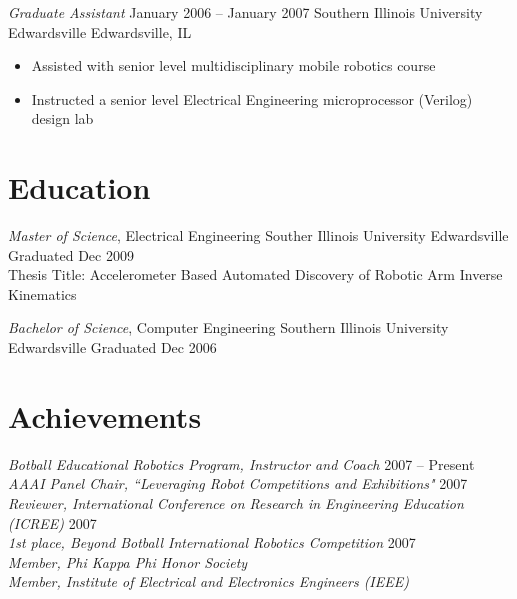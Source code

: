 \documentclass[margin,line]{resume}
\begin{document}
\begin{resume}
{\sl Graduate Assistant} \hfill January 2006 -- January 2007
Southern Illinois University Edwardsville \hfill Edwardsville, IL
\begin{itemize} \itemsep -2pt %
    \small\item Assisted with senior level multidisciplinary mobile robotics course
    \small\item Instructed a senior level Electrical Engineering microprocessor (Verilog) design lab
\end{itemize}

\section{Education}

{\small
  {\sl Master of Science}, Electrical Engineering \hfill
  Souther Illinois University Edwardsville \hfill
  Graduated Dec 2009\\
  Thesis Title: Accelerometer Based Automated Discovery of Robotic Arm Inverse Kinematics
}

{\small
  {\sl Bachelor of Science}, Computer Engineering \hfill
  Southern Illinois University Edwardsville \hfill
  Graduated Dec 2006
}

\section{Achievements}

{\sl Botball Educational Robotics Program, Instructor and Coach} \hfill 2007 -- Present\\
{\sl AAAI Panel Chair, ``Leveraging Robot Competitions and Exhibitions"} \hfill 2007\\
{\sl Reviewer, International Conference on Research in Engineering Education (ICREE)} \hfill 2007\\
{\sl 1st place, Beyond Botball International Robotics Competition} \hfill 2007\\
{\sl Member, Phi Kappa Phi Honor Society}\\
{\sl Member, Institute of Electrical and Electronics Engineers (IEEE)}\\


\end{resume}
\end{document}
